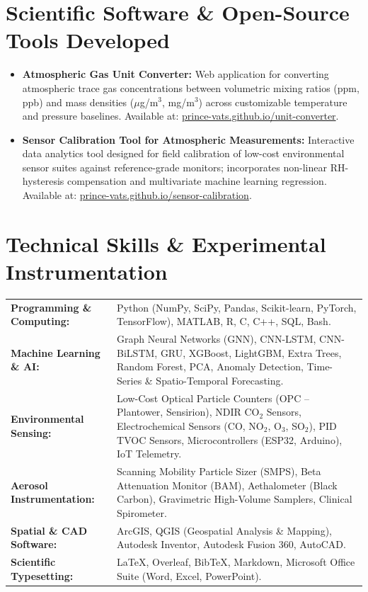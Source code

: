 \documentclass[10pt,a4paper]{article}
\begin{document}
\section{Scientific Software \& Open-Source Tools Developed}
\begin{itemize}
    \item \textbf{Atmospheric Gas Unit Converter:} Web application for converting atmospheric trace gas concentrations between volumetric mixing ratios (ppm, ppb) and mass densities ($\mu$g/m$^3$, mg/m$^3$) across customizable temperature and pressure baselines. Available at: \href{https://prince-vats.github.io/unit-converter/}{prince-vats.github.io/unit-converter}.
    \item \textbf{Sensor Calibration Tool for Atmospheric Measurements:} Interactive data analytics tool designed for field calibration of low-cost environmental sensor suites against reference-grade monitors; incorporates non-linear RH-hysteresis compensation and multivariate machine learning regression. Available at: \href{https://prince-vats.github.io/sensor-calibration/}{prince-vats.github.io/sensor-calibration}.
\end{itemize}

\section{Technical Skills \& Experimental Instrumentation}
\begin{tabularx}{\textwidth}{@{}p{}X@{}}
    \textbf{Programming \& Computing:} & Python (NumPy, SciPy, Pandas, Scikit-learn, PyTorch, TensorFlow), MATLAB, R, C, C++, SQL, Bash. \\
    \textbf{Machine Learning \& AI:} & Graph Neural Networks (GNN), CNN-LSTM, CNN-BiLSTM, GRU, XGBoost, LightGBM, Extra Trees, Random Forest, PCA, Anomaly Detection, Time-Series \& Spatio-Temporal Forecasting. \\
    \textbf{Environmental Sensing:} & Low-Cost Optical Particle Counters (OPC -- Plantower, Sensirion), NDIR CO$_{2}$ Sensors, Electrochemical Sensors (CO, NO$_{2}$, O$_{3}$, SO$_{2}$), PID TVOC Sensors, Microcontrollers (ESP32, Arduino), IoT Telemetry. \\
    \textbf{Aerosol Instrumentation:} & Scanning Mobility Particle Sizer (SMPS), Beta Attenuation Monitor (BAM), Aethalometer (Black Carbon), Gravimetric High-Volume Samplers, Clinical Spirometer. \\
    \textbf{Spatial \& CAD Software:} & ArcGIS, QGIS (Geospatial Analysis \& Mapping), Autodesk Inventor, Autodesk Fusion 360, AutoCAD. \\
    \textbf{Scientific Typesetting:} & \LaTeX, Overleaf, Bib\TeX, Markdown, Microsoft Office Suite (Word, Excel, PowerPoint).
\end{tabularx}
\end{document}
